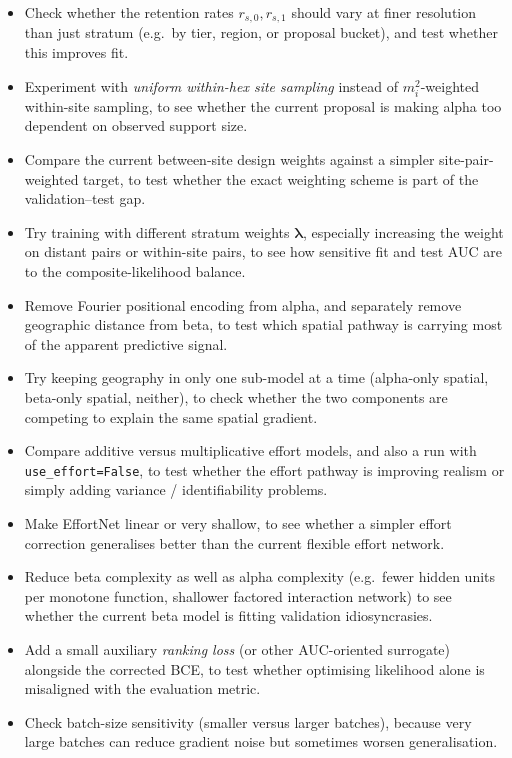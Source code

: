 \documentclass{article}
\begin{document}
\begin{itemize}
    \item Check whether the retention rates \(r_{s,0}, r_{s,1}\) should vary at finer resolution than just stratum (e.g.\ by tier, region, or proposal bucket), and test whether this improves fit.
    \item Experiment with \emph{uniform within-hex site sampling} instead of \(m_i^2\)-weighted within-site sampling, to see whether the current proposal is making alpha too dependent on observed support size.
    \item Compare the current between-site design weights against a simpler site-pair-weighted target, to test whether the exact weighting scheme is part of the validation--test gap.
    \item Try training with different stratum weights \(\bm{\lambda}\), especially increasing the weight on distant pairs or within-site pairs, to see how sensitive fit and test AUC are to the composite-likelihood balance.
    \item Remove Fourier positional encoding from alpha, and separately remove geographic distance from beta, to test which spatial pathway is carrying most of the apparent predictive signal.
    \item Try keeping geography in only one sub-model at a time (alpha-only spatial, beta-only spatial, neither), to check whether the two components are competing to explain the same spatial gradient.
    \item Compare additive versus multiplicative effort models, and also a run with \texttt{use\_effort=False}, to test whether the effort pathway is improving realism or simply adding variance / identifiability problems.
    \item Make EffortNet linear or very shallow, to see whether a simpler effort correction generalises better than the current flexible effort network.
    \item Reduce beta complexity as well as alpha complexity (e.g.\ fewer hidden units per monotone function, shallower factored interaction network) to see whether the current beta model is fitting validation idiosyncrasies.
    \item Add a small auxiliary \emph{ranking loss} (or other AUC-oriented surrogate) alongside the corrected BCE, to test whether optimising likelihood alone is misaligned with the evaluation metric.
    \item Check batch-size sensitivity (smaller versus larger batches), because very large batches can reduce gradient noise but sometimes worsen generalisation.

\end{itemize}
\end{document}
